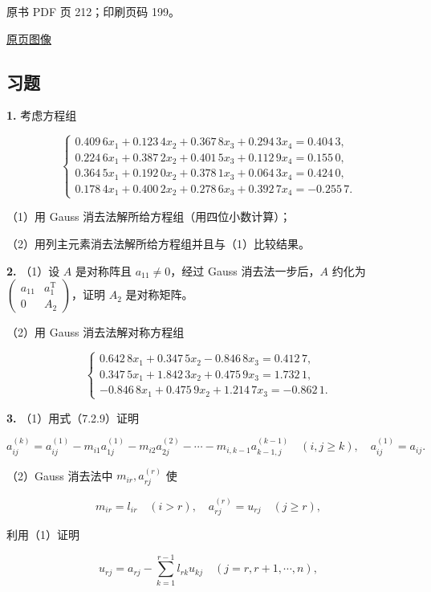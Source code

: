原书 PDF 页 212；印刷页码 199。

\href{source-images/pdf-212.jpeg}{原页图像}

\subsection{习题}\label{ch07b-ux4e60ux9898}

\textbf{1.} 考虑方程组

\[
\begin{cases}
0.409\,6x_1+0.123\,4x_2+0.367\,8x_3+0.294\,3x_4=0.404\,3,\\
0.224\,6x_1+0.387\,2x_2+0.401\,5x_3+0.112\,9x_4=0.155\,0,\\
0.364\,5x_1+0.192\,0x_2+0.378\,1x_3+0.064\,3x_4=0.424\,0,\\
0.178\,4x_1+0.400\,2x_2+0.278\,6x_3+0.392\,7x_4=-0.255\,7.
\end{cases}
\]

（1）用 Gauss 消去法解所给方程组（用四位小数计算）；

（2）用列主元素消去法解所给方程组并且与（1）比较结果。

\textbf{2.} （1）设 \(A\) 是对称阵且 \(a_{11}\neq0\)，经过 Gauss 消去法一步后，\(A\) 约化为 \(\begin{pmatrix}a_{11}&a_1^{\mathrm T}\\0&A_2\end{pmatrix}\)，证明 \(A_2\) 是对称矩阵。

（2）用 Gauss 消去法解对称方程组

\[
\begin{cases}
0.642\,8x_1+0.347\,5x_2-0.846\,8x_3=0.412\,7,\\
0.347\,5x_1+1.842\,3x_2+0.475\,9x_3=1.732\,1,\\
-0.846\,8x_1+0.475\,9x_2+1.214\,7x_3=-0.862\,1.
\end{cases}
\]

\textbf{3.} （1）用式（7.2.9）证明

\[
a_{ij}^{(k)}=a_{ij}^{(1)}-m_{i1}a_{1j}^{(1)}-m_{i2}a_{2j}^{(2)}-\cdots-m_{i,k-1}a_{k-1,j}^{(k-1)}
\quad(i,j\geqslant k),\quad a_{ij}^{(1)}=a_{ij}.
\]

（2）Gauss 消去法中 \(m_{ir},a_{rj}^{(r)}\) 使

\[
m_{ir}=l_{ir}\quad(i>r),\quad a_{rj}^{(r)}=u_{rj}\quad(j\geqslant r),
\]

利用（1）证明

\[
u_{rj}=a_{rj}-\sum_{k=1}^{r-1}l_{rk}u_{kj}\quad(j=r,r+1,\cdots,n),
\]

